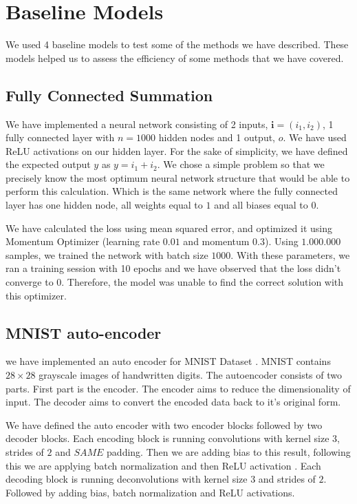 \section{Baseline Models}

We used 4 baseline models to test some of the methods we have described. These models helped us to assess the efficiency of some methods that we have covered.

\subsection{Fully Connected Summation}
We have implemented a neural network consisting of 2 inputs, $\mathbf{i} = (i_1, i_2)$, 1 fully connected layer with $n = 1000$ hidden nodes and 1 output, $o$. We have used ReLU \cite{nair2010rectified} activations on our hidden layer. For the sake of simplicity, we have defined the expected output $y$ as $y = i_1 + i_2$. We chose a simple problem so that we precisely know the most optimum neural network structure that would be able to perform this calculation. Which is the same network where the fully connected layer has one hidden node, all weights equal to $1$ and all biases equal to $0$.

We have calculated the loss using mean squared error, and optimized it using Momentum Optimizer (learning rate $0.01$ and momentum $0.3$). Using $1.000.000$ samples, we trained the network with batch size $1000$. With these parameters, we ran a training session with 10 epochs and we have observed that the loss didn't converge to 0. Therefore, the model was unable to find the correct solution with this optimizer. 

\subsection{MNIST auto-encoder}
we have implemented an auto encoder for MNIST Dataset \cite{lecun1998mnist}. MNIST contains $28 \times 28$ grayscale images of handwritten digits. The autoencoder consists of two parts. First part is the encoder. The encoder aims to reduce the dimensionality of input. The decoder aims to convert the encoded data back to it's original form.

We have defined the auto encoder with two encoder blocks followed by two decoder blocks. Each encoding block is running convolutions with kernel size $3$, strides of $2$ and $SAME$ padding. Then we are adding bias to this result, following this we are applying batch normalization \cite{ioffe2015batch} and then ReLU activation \cite{nair2010rectified}. Each decoding block is running deconvolutions with kernel size $3$ and strides of $2$. Followed by adding bias, batch normalization and ReLU activations. 

